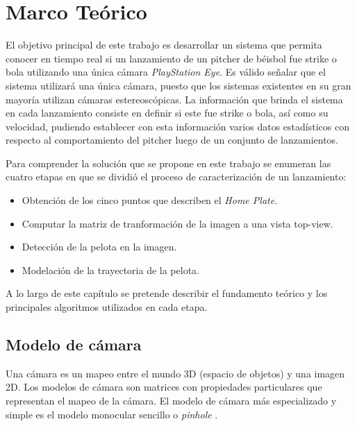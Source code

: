 \chapter{Marco Teórico}\label{chapter:theorical}

El objetivo principal de este trabajo es desarrollar un sistema que permita conocer en tiempo real si un lanzamiento de un pitcher de béisbol fue strike o bola utilizando una única cámara \textit{PlayStation Eye}. Es válido señalar que el sistema utilizará una única cámara, puesto que los sistemas existentes en su gran mayoría utilizan cámaras estereoscópicas. La información que brinda el sistema en cada lanzamiento consiste en definir si este fue strike o bola, así como su velocidad, pudiendo establecer con esta información varios datos estadísticos con respecto al comportamiento del pitcher luego de un conjunto de lanzamientos.

Para comprender la solución que se propone en este trabajo se enumeran las cuatro etapas en que se dividió el proceso de caracterización de un lanzamiento:

\begin{itemize}
    \item Obtención de los cinco puntos que describen el \textit{Home Plate}.
    \item Computar la matriz de tranformación de la imagen a una vista top-view.
    \item Detección de la pelota en la imagen.
    \item Modelación de la trayectoria de la pelota.
\end{itemize}

A lo largo de este capítulo se pretende describir el fundamento teórico y los principales algoritmos utilizados en cada etapa.

\section{Modelo de cámara}

Una cámara es un mapeo entre el mundo 3D (espacio de objetos) y una imagen 2D. Los modelos de cámara son matrices con propiedades particulares que representan el mapeo de la cámara. El modelo de cámara más especializado y simple es el modelo monocular sencillo o \textit{pinhole} \cite{RichardAndrew}.\\

